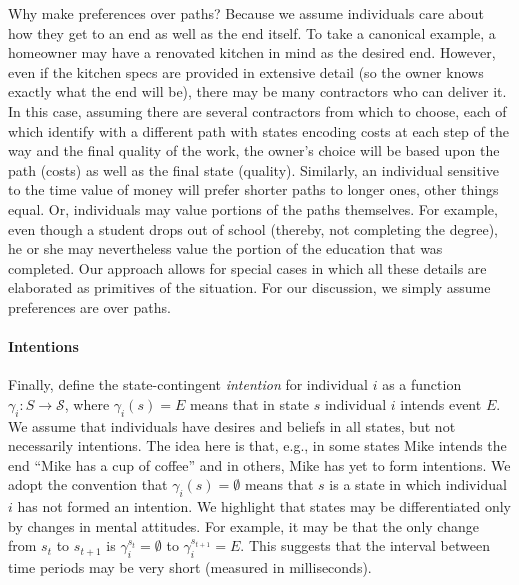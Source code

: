 \documentclass[
11pt,
titlepage,
reqno,
]{article}%
\theoremstyle{definition}
\begin{document}
	Why make preferences over paths? Because we assume individuals care about how they get to an end as well as the end itself. 
	To take a canonical example, a homeowner may have a renovated kitchen in mind as the desired end. 
	However, even if the kitchen specs are provided in extensive detail (so the owner knows exactly what the end will be), there may be many contractors who can deliver it. 
	In this case, assuming there are several contractors from which to choose, each of which identify with a different path with states encoding costs  at each step of the way and the final quality of the work, the owner's choice will be based upon the path (costs) as well as the final state (quality). 
	Similarly, an individual sensitive to the time value of money will prefer shorter paths to longer ones, other things equal. 
	Or, individuals may value portions of the paths themselves.
	For example, even though a student drops out of school (thereby, not completing the degree), he or she may nevertheless value the portion of the education that was completed. 
	Our approach allows for special cases in which all these details are elaborated as primitives of the situation. For our discussion, we simply assume preferences are over paths.    %
	
	
	\paragraph{Intentions \label{para: intentions}}
	
	Finally, define the state-contingent \textit{intention} for individual $i$ as a function $\gamma_i:S\rightarrow \mathcal{S}$, where $\gamma_i(s)=E$ means that in state $s$ individual $i$ intends event $E$. 
	We assume that individuals have desires and beliefs in all states, but not necessarily intentions. 
	The idea here is that, e.g., in some states Mike intends the end ``Mike has a cup of coffee'' and in others, Mike has yet to form intentions.
	We adopt the convention that $\gamma_i(s)=\emptyset$ means that $s$ is a state in which individual $i$ has not formed an intention. 
	We highlight that states may be differentiated only by changes in mental attitudes. 
	For example, it may be that the only change from $s_t$ to $s_{t+1}$ is $\gamma_i^{s_t}=\emptyset$ to $\gamma_i^{s_{t+1}}=E$.
	This suggests that the interval between time periods may be very short (measured in milliseconds).
	
\end{document}

